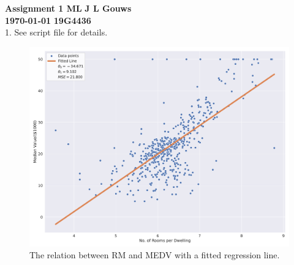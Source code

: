 \documentclass[a4paper,12pt]{article}
\newcommand\block[1]{\hspace*{#1}}
\begin{document}
\selectfont
\thispagestyle{empty}

{\Large \textbf{Assignment 1 ML}} \hfill {\Large \textbf{J L Gouws}}\\
\block{1.0cm} {\large \textbf{\today}} \hfill {\large \textbf{19G4436}}\\

1. See script file for details.
\begin{figure}[H]
  \centering
  \includegraphics[scale = 0.4]{Task1/RMvsMEV.pdf}
  \caption{The relation between RM and MEDV with a fitted regression line.}
\end{figure}
\end{document}
